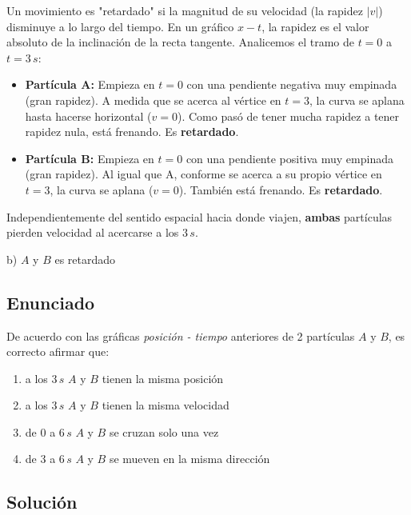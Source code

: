\documentclass[12pt, a4paper]{article}
\begin{document}
Un movimiento es "retardado" si la magnitud de su velocidad (la rapidez $|v|$) disminuye a lo largo del tiempo. En un gráfico $x-t$, la rapidez es el valor absoluto de la inclinación de la recta tangente.
Analicemos el tramo de $t=0$ a $t=3\,\si{s}$:
\begin{itemize}
    \item \textbf{Partícula A:} Empieza en $t=0$ con una pendiente negativa muy empinada (gran rapidez). A medida que se acerca al vértice en $t=3$, la curva se aplana hasta hacerse horizontal ($v=0$). Como pasó de tener mucha rapidez a tener rapidez nula, está frenando. Es \textbf{retardado}.
    \item \textbf{Partícula B:} Empieza en $t=0$ con una pendiente positiva muy empinada (gran rapidez). Al igual que A, conforme se acerca a su propio vértice en $t=3$, la curva se aplana ($v=0$). También está frenando. Es \textbf{retardado}.
\end{itemize}

Independientemente del sentido espacial hacia donde viajen, \textbf{ambas} partículas pierden velocidad al acercarse a los $3\,\si{s}$.

\begin{tcolorbox}[colback=green!5!white, colframe=green!50!black, title=Respuesta Final]
\centering \Large b) $A$ y $B$ es retardado
\end{tcolorbox}

\newpage

\subsection*{Enunciado}
De acuerdo con las gráficas \textit{posición - tiempo} anteriores de 2 partículas $A$ y $B$, es correcto afirmar que:
\begin{enumerate}[label=\alph*)]
    \item a los $3\,\si{s}$ $A$ y $B$ tienen la misma posición
    \item a los $3\,\si{s}$ $A$ y $B$ tienen la misma velocidad
    \item de $0$ a $6\,\si{s}$ $A$ y $B$ se cruzan solo una vez
    \item de $3$ a $6\,\si{s}$ $A$ y $B$ se mueven en la misma dirección
\end{enumerate}

\subsection*{Solución}
\end{document}
